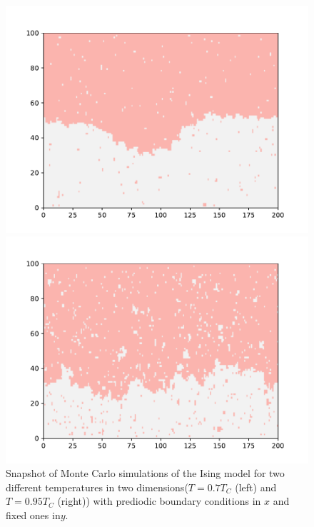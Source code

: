 {\begin{figure}[t]
	\begin{minipage}[t]{0.5\linewidth}
		\includegraphics[width=\linewidth]{int-dyn/inte07.pdf}
	\end{minipage}%
	\begin{minipage}[t]{0.5\linewidth}
		\includegraphics[width=\linewidth]{int-dyn/inte09.pdf}
	\end{minipage}
	\caption{Snapshot of Monte Carlo simulations of the Ising model for two different temperatures in two dimensions($T=0.7 T_C$ (left) and $T=0.95 T_C$ (right)) with prediodic boundary conditions in $x$ and fixed ones in$y$.}
	\label{amas-fixe}
\end{figure}  


}
